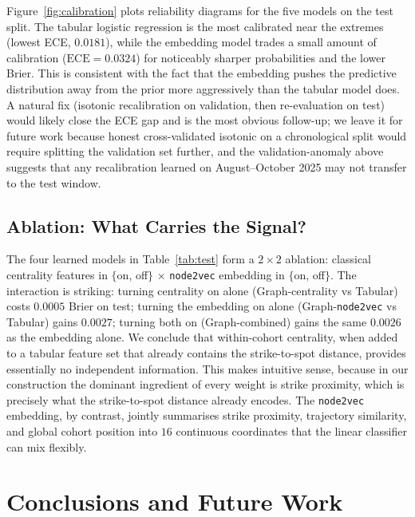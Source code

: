 \documentclass{article} %
\begin{document}
Figure~\ref{fig:calibration} plots reliability diagrams for the five models on the test split. The tabular logistic regression is the most calibrated near the extremes (lowest ECE, $0.0181$), while the embedding model trades a small amount of calibration ($\text{ECE}=0.0324$) for noticeably sharper probabilities and the lower Brier. This is consistent with the fact that the embedding pushes the predictive distribution away from the prior more aggressively than the tabular model does. A natural fix (isotonic recalibration on validation, then re-evaluation on test) would likely close the ECE gap and is the most obvious follow-up; we leave it for future work because honest cross-validated isotonic on a chronological split would require splitting the validation set further, and the validation-anomaly above suggests that any recalibration learned on August--October 2025 may not transfer to the test window.

\subsection{Ablation: What Carries the Signal?}

The four learned models in Table~\ref{tab:test} form a $2\times 2$ ablation: classical centrality features in $\{$on, off$\}$ $\times$ \texttt{node2vec} embedding in $\{$on, off$\}$. The interaction is striking: turning centrality on alone (Graph-centrality vs Tabular) costs $0.0005$ Brier on test; turning the embedding on alone (Graph-\texttt{node2vec} vs Tabular) gains $0.0027$; turning both on (Graph-combined) gains the same $0.0026$ as the embedding alone. We conclude that within-cohort centrality, when added to a tabular feature set that already contains the strike-to-spot distance, provides essentially no independent information. This makes intuitive sense, because in our construction the dominant ingredient of every weight is strike proximity, which is precisely what the strike-to-spot distance already encodes. The \texttt{node2vec} embedding, by contrast, jointly summarises strike proximity, trajectory similarity, and global cohort position into $16$ continuous coordinates that the linear classifier can mix flexibly.

\section{Conclusions and Future Work}
\end{document}
